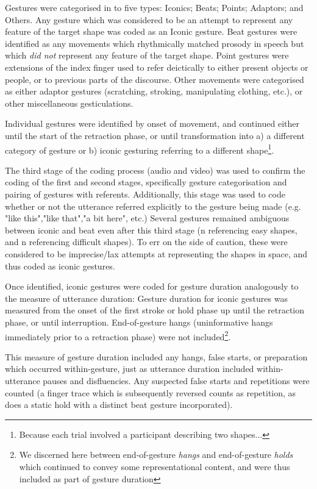 \documentclass[a4paper,man,natbib]{apa6}
\newcommand*{\term}[1]{\emph{#1}} %
\begin{document}
Gestures were categorised in to five types: Iconics; Beats; Points; Adaptors; and Others. 
Any gesture which was considered to be an attempt to represent any feature of the target shape was coded as an Iconic gesture.
Beat gestures were identified as any movements which rhythmically matched prosody in speech but which \emph{did not} represent any feature of the target shape.
Point gestures were extensions of the index finger used to refer deictically to either present objects or people, or to previous parts of the discourse.
Other movements were categorised as either adaptor gestures (scratching, stroking, manipulating clothing, etc.), or other miscellaneous gesticulations.

Individual gestures were identified by onset of movement, and continued either until the start of the retraction phase, or until transformation into a) a different category of gesture or b) iconic gesturing referring to a different shape\footnote{Because each trial involved a participant describing two shapes...}. 

The third stage of the coding process (audio and video) was used to confirm the coding of the first and second stages, specifically gesture categorisation and pairing of gestures with referents.
Additionally, this stage was used to code whether or not the utterance referred explicitly to the gesture being made (e.g. "like this","like that","a bit here", etc.)
Several gestures remained ambiguous between iconic and beat even after this third stage (n referencing easy shapes, and n referencing difficult shapes).%
To err on the side of caution, these were considered to be imprecise/lax attempts at representing the shapes in space, and thus coded as iconic gestures.

Once identified, iconic gestures were coded for gesture duration analogously to the measure of utterance duration:
Gesture duration for iconic gestures was measured from the onset of the first stroke or hold phase up until the retraction phase, or until interruption.
End-of-gesture hangs (uninformative hangs immediately prior to a retraction phase) were not included\footnote{We discerned here between end-of-gesture \term{hangs} and end-of-gesture \term{holds} which continued to convey some representational content, and were thus included as part of gesture duration}.

This measure of gesture duration included any hangs, false starts, or preparation which occurred within-gesture, just as utterance duration included within-utterance pauses and disfluencies.
Any suspected false starts and repetitions were counted (a finger trace which is subsequently reversed counts as repetition, as does a static hold with a distinct beat gesture incorporated).
\end{document}
